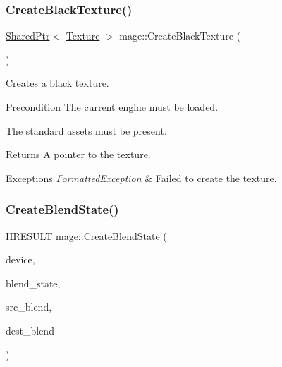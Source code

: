 \hypertarget{namespacemage_a67c2c82133bfbce0b54db0faee82f79f}{}\label{namespacemage_a67c2c82133bfbce0b54db0faee82f79f} 
\subsubsection{\texorpdfstring{Create\+Black\+Texture()}{CreateBlackTexture()}}
{\footnotesize\ttfamily \hyperlink{namespacemage_a1e01ae66713838a7a67d30e44c67703e}{Shared\+Ptr}$<$ \hyperlink{classmage_1_1_texture}{Texture} $>$ mage\+::\+Create\+Black\+Texture (\begin{DoxyParamCaption}{ }\end{DoxyParamCaption})}

Creates a black texture.

\begin{DoxyPrecond}{Precondition}
The current engine must be loaded. 

The standard assets must be present. 
\end{DoxyPrecond}
\begin{DoxyReturn}{Returns}
A pointer to the texture. 
\end{DoxyReturn}

\begin{DoxyExceptions}{Exceptions}
{\em \hyperlink{structmage_1_1_formatted_exception}{Formatted\+Exception}} & Failed to create the texture. \\
\hline
\end{DoxyExceptions}
\hypertarget{namespacemage_ad2c838028ab44521fe1818721dd7ade1}{}\label{namespacemage_ad2c838028ab44521fe1818721dd7ade1} 
\subsubsection{\texorpdfstring{Create\+Blend\+State()}{CreateBlendState()}}
{\footnotesize\ttfamily H\+R\+E\+S\+U\+LT mage\+::\+Create\+Blend\+State (\begin{DoxyParamCaption}\item[{I\+D3\+D11\+Device2 $\ast$}]{device,  }\item[{I\+D3\+D11\+Blend\+State $\ast$$\ast$}]{blend\+\_\+state,  }\item[{D3\+D11\+\_\+\+B\+L\+E\+ND}]{src\+\_\+blend,  }\item[{D3\+D11\+\_\+\+B\+L\+E\+ND}]{dest\+\_\+blend }\end{DoxyParamCaption})}

